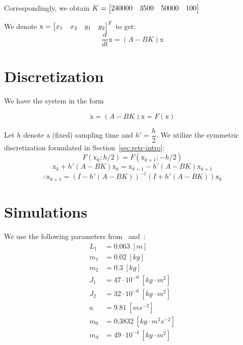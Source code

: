 Correspondingly, we obtain $K = \begin{bmatrix}240000 & 3500 & 50000 & 100\end{bmatrix}$

We denote $\text{x} = \begin{bmatrix}x_1 & x_2 & y_1 & y_2\end{bmatrix}^T$ to get:
\begin{equation}\label{eq:feedback}
    \dfrac{d}{dt} \text{x}
    = \left( A - B K \right) \text{x}
\end{equation}

\section{Discretization}
We have the system in the form 

\[ \dot{\text{x}} = (A-BK)\text{x} = F(\text{x}) \] 

Let $h$ denote a (fixed) sampling time and $h' = \dfrac{h}{2}$. We utilize the symmetric discretization formulated in Section~\ref{sec:retr-intro}:
\[
F(\text{x}_k; h/2) = F(\text{x}_{k+1}; -h/2)
\]
$$
\text{x}_k + h' (A-BK) \text{x}_k = \text{x}_{k+1} - h'(A-BK) \text{x}_{k+1} 
$$
\begin{equation}
    \therefore \text{x}_{k+1} = {(I - h'(A-BK))}^{-1}(I + h'(A-BK)) \text{x}_k
\end{equation}

\section{Simulations}
We use the following parameters from~\cite{nowicki} and~\cite{SPONG20011845}:
\begin{equation}
\begin{split}
    L_1 & = 0.063 \ [m] \\
    m_1 & = 0.02 \ [kg] \\
    m_2 & = 0.3 \ [kg] \\
    J_1 & = 47 \cdot 10^{-6} \ [kg \cdot m^2] \\
    J_2 & = 32 \cdot 10^{-6} \ [kg \cdot m^2] \\
    a & = 9.81 \ [m s^{-2}] \\
    m_0 & = 0.3832 \ [kg \cdot m^2 s^{-2}] \\
    m_d & = 49 \cdot 10^{-4} \ [kg \cdot m^2] 
\end{split}
\end{equation}

